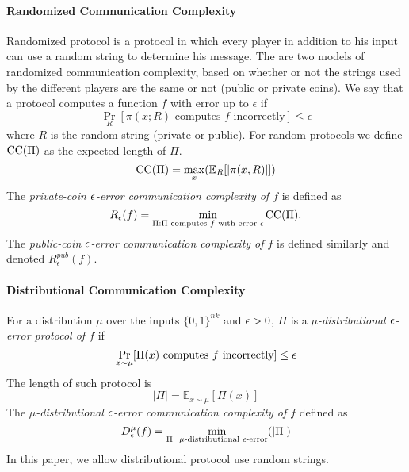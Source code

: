 \paragraph{Randomized Communication Complexity} Randomized protocol is a protocol in which every player in addition to his input can use a random string to determine his message. The are two models of randomized communication complexity, based on whether or not the strings used by the different players are the same or not (public or private coins). \newline
We say that a protocol computes a function $f$ with error up to $\epsilon$ if 
\begin{equation*}
    \Pr_R[\pi(x;R) \text{ computes $f$ incorrectly}] \leq \epsilon 
\end{equation*}
where $R$ is the random string (private or public). \newline
For random protocols we define $\mathrm{CC}(\Pi)$ as the expected length of $\Pi$.
\begin{equation*}
    \mathrm{CC}(\Pi) = \max_x(\mathbb{E}_{R}[|\pi(x, R)|])
\end{equation*}
The \emph{private-coin $\epsilon$-error communication complexity of $f$} is defined as
\begin{equation*}
	R_\epsilon(f) = \min_{\Pi : \text{$\Pi$ computes $f$ with error $\epsilon$}} \mathrm{CC}(\Pi).
\end{equation*}
The \emph{public-coin $\epsilon$-error communication complexity of $f$} is defined similarly and denoted $R^{pub}_{\epsilon}(f)$.

\paragraph{Distributional Communication Complexity} For a distribution $\mu$ over the inputs $\{0,1\}^{nk}$ and $\epsilon > 0$, $\Pi$ is a \emph{$\mu$-distributional $\epsilon$-error protocol of $f$} if 
\begin{equation*}
    \Pr_{x \sim \mu}[\Pi(x) \text{ computes $f$ incorrectly}] \leq \epsilon
\end{equation*}
The length of such protocol is 
\begin{equation*}
    |\Pi| = \mathbb{E}_{x \sim \mu}[\Pi(x)]
\end{equation*}
The \emph{$\mu$-distributional $\epsilon$-error communication complexity of $f$} defined as 
\begin{equation*}
    D^{\mu}_{\epsilon}(f) = \min_{\text{$\Pi$: $\mu$-distributional $\epsilon$-error}}(|\Pi|)
\end{equation*}
In this paper, we allow distributional protocol use random strings.
